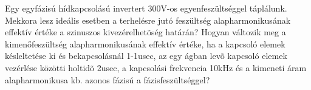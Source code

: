 \begin{example}

Egy egyfázisú hídkapcsolású invertert 300V-os egyenfeszültséggel táplálunk. Mekkora lesz ideális esetben a terhelésre jutó feszültség alapharmonikusának effektív értéke a szinuszos kivezérelhetõség határán? Hogyan változik meg a kimenőfeszültség alapharmonikusának effektív értéke, ha a kapcsoló elemek késleltetése ki és bekapcsolásnál 1-1usec, az egy ágban levõ kapcsoló elemek vezérlése közötti holtidõ 2usec, a kapcsolási frekvencia 10kHz és a kimeneti áram alapharmonikusa kb. azonos fázisú a fázisfeszültséggel?

\tcbline
\vspace{1mm}

\solution

\end{example}